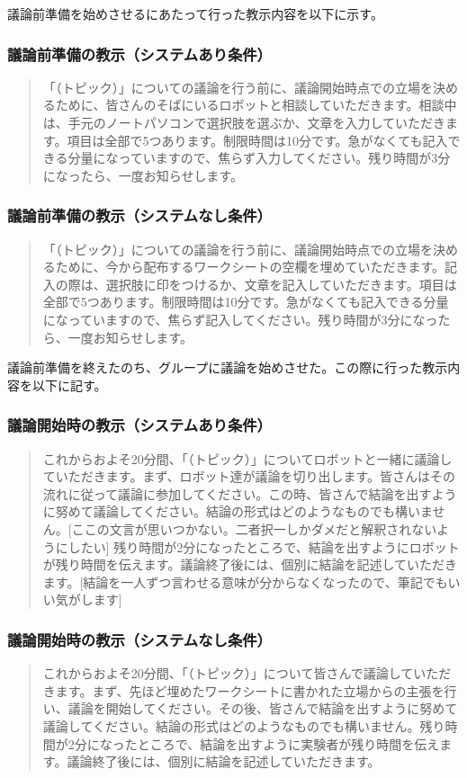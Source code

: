 \documentclass[11pt, a4paper]{jreport} %
\begin{document}
議論前準備を始めさせるにあたって行った教示内容を以下に示す。

\subsubsection*{議論前準備の教示（システムあり条件）}
\begin{quote}
「（トピック）」についての議論を行う前に、議論開始時点での立場を決めるために、皆さんのそばにいるロボットと相談していただきます。相談中は、手元のノートパソコンで選択肢を選ぶか、文章を入力していただきます。項目は全部で5つあります。制限時間は10分です。急がなくても記入できる分量になっていますので、焦らず入力してください。残り時間が3分になったら、一度お知らせします。
\end{quote}
\subsubsection*{議論前準備の教示（システムなし条件）}
\begin{quote}
「（トピック）」についての議論を行う前に、議論開始時点での立場を決めるために、今から配布するワークシートの空欄を埋めていただきます。記入の際は、選択肢に印をつけるか、文章を記入していただきます。項目は全部で5つあります。制限時間は10分です。急がなくても記入できる分量になっていますので、焦らず記入してください。残り時間が3分になったら、一度お知らせします。
\end{quote}


議論前準備を終えたのち、グループに議論を始めさせた。この際に行った教示内容を以下に記す。

\subsubsection*{議論開始時の教示（システムあり条件）}
\begin{quote}
これからおよそ20分間、「（トピック）」についてロボットと一緒に議論していただきます。まず、ロボット達が議論を切り出します。皆さんはその流れに従って議論に参加してください。この時、皆さんで結論を出すように努めて議論してください。結論の形式はどのようなものでも構いません。[ここの文言が思いつかない。二者択一しかダメだと解釈されないようにしたい]
残り時間が2分になったところで、結論を出すようにロボットが残り時間を伝えます。議論終了後には、個別に結論を記述していただきます。[結論を一人ずつ言わせる意味が分からなくなったので、筆記でもいい気がします]%
\end{quote}
\subsubsection*{議論開始時の教示（システムなし条件）}
\begin{quote}
これからおよそ20分間、「（トピック）」について皆さんで議論していただきます。まず、先ほど埋めたワークシートに書かれた立場からの主張を行い、議論を開始してください。その後、皆さんで結論を出すように努めて議論してください。結論の形式はどのようなものでも構いません。残り時間が2分になったところで、結論を出すように実験者が残り時間を伝えます。議論終了後には、個別に結論を記述していただきます。%
\end{quote}
\end{document}
